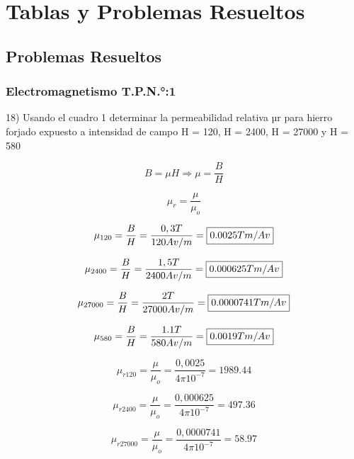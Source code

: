 \pagestyle{empty}
\chapter{Tablas y Problemas Resueltos}
\section{Problemas Resueltos}
\subsection{Electromagnetismo T.P.N.°:1}
\newcommand{\cuadro}[1]{\fbox{$#1$}}

18) Usando el cuadro 1 determinar la permeabilidad relativa µr para hierro forjado expuesto a
intensidad de campo H = 120, H = 2400, H = 27000 y H = 580

\begin{equation}
B=\mu H \Rightarrow \mu=\frac{B}{H}
\end{equation}

\begin{equation}
\mu_r= \frac{\mu}{\mu_o}
\end{equation}

\begin{equation}
\mu_{120}=\frac{B}{H}= \frac{0,3T}{120Av/m}= \cuadro{0.0025 Tm/Av}
\end{equation}

\begin{equation}
\mu_{2400}=\frac{B}{H}= \frac{1,5T}{2400Av/m}= \cuadro{0.000625 Tm/Av}
\end{equation}

\begin{equation}
\mu_{27000}=\frac{B}{H}= \frac{2T}{27000Av/m}= \cuadro{0.0000741 Tm/Av}
\end{equation}

\begin{equation}
\mu_{580}=\frac{B}{H}= \frac{1.1T}{580Av/m}= \cuadro{0.0019 Tm/Av}
\end{equation}

\begin{equation}
\mu_{r120}=\frac{\mu}{\mu_o}= \frac{0,0025}{4\pi 10^{-7}}=
1989.44
\end{equation}

\begin{equation}
\mu_{r2400}=\frac{\mu}{\mu_o}= \frac{0,000625}{4\pi 10^{-7}}=
497.36
\end{equation}

\begin{equation}
\mu_{r27000}=\frac{\mu}{\mu_o}= \frac{0,0000741}{4\pi 10^{-7}}=
58.97
\end{equation}


